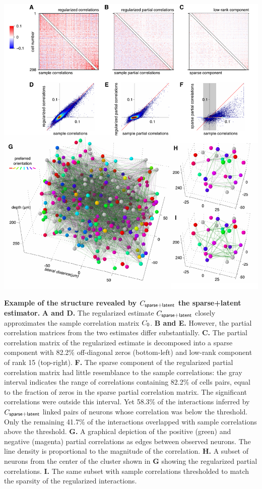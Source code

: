 \documentclass[10pt]{article}
\begin{document}
\begin{FPfigure}
    \begin{center}
        \includegraphics[width=17.35cm]{./figures/Figure05.pdf}
    \end{center}
    \caption{{\bf Example of the structure revealed by $C_{\sf sparse+latent}$ the sparse+latent estimator.}
    {\bf A and D.} The regularized estimate $C_{\sf sparse+latent}$ closely approximates the sample correlation matrix $C_{\sf 0}$. 
    {\bf B and E.} However, the partial correlation matrices from the two estimates differ substantially.
    {\bf C.} The partial correlation matrix of the regularized estimate is decomposed into a sparse component with 82.2\% off-diagonal zeros (bottom-left) and low-rank component of rank 15 (top-right).
    {\bf F.} The sparse component of the regularized partial correlation matrix had little resemblance to the sample correlations: the gray interval indicates the range of correlations containing 82.2\% of cells pairs, equal to the fraction of zeros in the sparse partial correlation matrix. The significant correlations were outside this interval. Yet 58.3\% of the interactions inferred by $C_{\sf sparse+latent}$  linked pairs of neurons whose correlation was below the threshold. Only the remaining 41.7\% of the interactions overlapped with sample correlations above the threshold.
    {\bf G.} A graphical depiction of the positive (green) and negative (magenta) partial correlations as edges between observed neurons. The line density is proportional to the magnitude of the correlation.
    {\bf H.} A subset of neurons from the center of the cluster shown in {\bf G} showing the regularized partial correlations.
    {\bf I.} The same subset with sample correlations thresholded to match the sparsity of the regularized interactions.
}
\label{fig:05}
\end{FPfigure}
\end{document}
